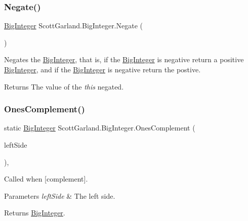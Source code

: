 \subsubsection{\texorpdfstring{Negate()}{Negate()}}
{\footnotesize\ttfamily \hyperlink{class_scott_garland_1_1_big_integer}{Big\+Integer} Scott\+Garland.\+Big\+Integer.\+Negate (\begin{DoxyParamCaption}{ }\end{DoxyParamCaption})\hspace{0.3cm}{\ttfamily [inline]}}



Negates the \hyperlink{class_scott_garland_1_1_big_integer}{Big\+Integer}, that is, if the \hyperlink{class_scott_garland_1_1_big_integer}{Big\+Integer} is negative return a positive \hyperlink{class_scott_garland_1_1_big_integer}{Big\+Integer}, and if the \hyperlink{class_scott_garland_1_1_big_integer}{Big\+Integer} is negative return the postive. 

\begin{DoxyReturn}{Returns}
The value of the {\itshape this}  negated.
\end{DoxyReturn}
\mbox{\label{class_scott_garland_1_1_big_integer_ac47135fd6f248d218993915446bf5eb5}} 
\subsubsection{\texorpdfstring{Ones\+Complement()}{OnesComplement()}}
{\footnotesize\ttfamily static \hyperlink{class_scott_garland_1_1_big_integer}{Big\+Integer} Scott\+Garland.\+Big\+Integer.\+Ones\+Complement (\begin{DoxyParamCaption}\item[{\hyperlink{class_scott_garland_1_1_big_integer}{Big\+Integer}}]{left\+Side }\end{DoxyParamCaption})\hspace{0.3cm}{\ttfamily [inline]}, {\ttfamily [static]}}



Called when \mbox{[}complement\mbox{]}. 


\begin{DoxyParams}{Parameters}
{\em left\+Side} & The left side.\\
\hline
\end{DoxyParams}
\begin{DoxyReturn}{Returns}
\hyperlink{class_scott_garland_1_1_big_integer}{Big\+Integer}.
\end{DoxyReturn}
\mbox{\label{class_scott_garland_1_1_big_integer_ab7ca7bc80abdb8236d2a02468c7025ec}} 
